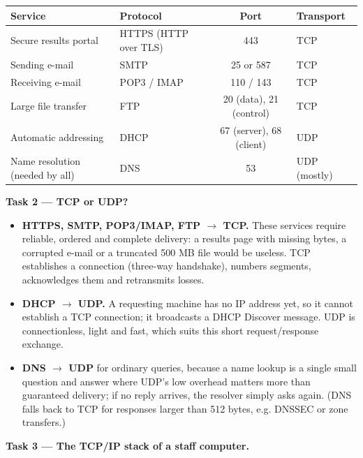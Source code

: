 \documentclass[11pt]{article}
\newcommand{\cle}[1]{{\popxbold\color{popdark}#1}}
\begin{document}
\begin{center}
\begin{tabular}{|l|l|c|l|}
\hline
\rowcolor{popblueL} \textbf{Service} & \textbf{Protocol} & \textbf{Port} & \textbf{Transport} \\
\hline
Secure results portal & HTTPS (HTTP over TLS) & 443 & TCP \\
\hline
Sending e-mail & SMTP & 25 or 587 & TCP \\
\hline
Receiving e-mail & POP3 / IMAP & 110 / 143 & TCP \\
\hline
Large file transfer & FTP & 20 (data), 21 (control) & TCP \\
\hline
Automatic addressing & DHCP & 67 (server), 68 (client) & UDP \\
\hline
Name resolution (needed by all) & DNS & 53 & UDP (mostly) \\
\hline
\end{tabular}
\end{center}

\textbf{Task 2 — TCP or UDP?}

\begin{itemize}
\item \textbf{HTTPS, SMTP, POP3/IMAP, FTP $\rightarrow$ TCP.} These services require \cle{reliable}, ordered and complete delivery: a results page with missing bytes, a corrupted e-mail or a truncated 500 MB file would be useless. TCP establishes a connection (three-way handshake), numbers segments, acknowledges them and retransmits losses.
\item \textbf{DHCP $\rightarrow$ UDP.} A requesting machine has no IP address yet, so it cannot establish a TCP connection; it broadcasts a DHCP Discover message. UDP is connectionless, light and fast, which suits this short request/response exchange.
\item \textbf{DNS $\rightarrow$ UDP} for ordinary queries, because a name lookup is a single small question and answer where UDP's low overhead matters more than guaranteed delivery; if no reply arrives, the resolver simply asks again. (DNS falls back to TCP for responses larger than 512 bytes, e.g. DNSSEC or zone transfers.)
\end{itemize}

\textbf{Task 3 — The TCP/IP stack of a staff computer.}
\end{document}
